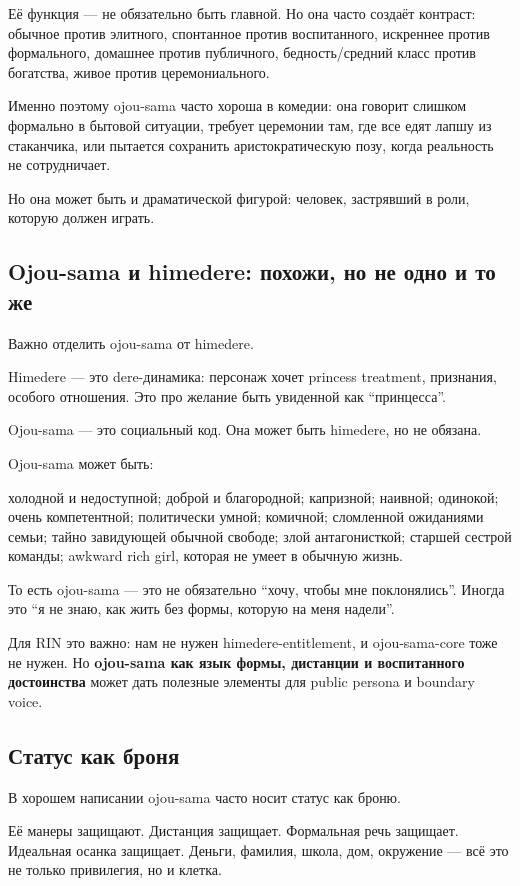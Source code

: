 Её функция --- не обязательно быть главной. Но она часто создаёт
контраст: обычное против элитного, спонтанное против воспитанного,
искреннее против формального, домашнее против публичного,
бедность/\hspace{0pt}средний класс против богатства, живое против церемониального.

Именно поэтому ojou-sama часто хороша в комедии: она говорит слишком
формально в бытовой ситуации, требует церемонии там, где все едят лапшу
из стаканчика, или пытается сохранить аристократическую позу, когда
реальность не сотрудничает.

Но она может быть и драматической фигурой: человек, застрявший в роли,
которую должен играть.

\subsection*{Ojou-sama и himedere: похожи, но не одно и то же}

Важно отделить ojou-sama от himedere.

Himedere --- это dere-динамика: персонаж хочет princess treatment,
признания, особого отношения. Это про желание быть увиденной как
``принцесса''.

Ojou-sama --- это социальный код. Она может быть himedere, но не
обязана.

Ojou-sama может быть:

холодной и недоступной; доброй и благородной; капризной; наивной;
одинокой; очень компетентной; политически умной; комичной; сломленной
ожиданиями семьи; тайно завидующей обычной свободе; злой антагонисткой;
старшей сестрой команды; awkward rich girl, которая не умеет в обычную
жизнь.

То есть ojou-sama --- это не обязательно ``хочу, чтобы мне
поклонялись''. Иногда это ``я не знаю, как жить без формы, которую на
меня надели''.

Для RIN это важно: нам не нужен himedere-entitlement, и ojou-sama-core
тоже не нужен. Но \textbf{ojou-sama как язык формы, дистанции и
воспитанного достоинства} может дать полезные элементы для public
persona и boundary voice.

\subsection*{Статус как броня}

В хорошем написании ojou-sama часто носит статус как броню.

Её манеры защищают. Дистанция защищает. Формальная речь защищает.
Идеальная осанка защищает. Деньги, фамилия, школа, дом, окружение ---
всё это не только привилегия, но и клетка.

